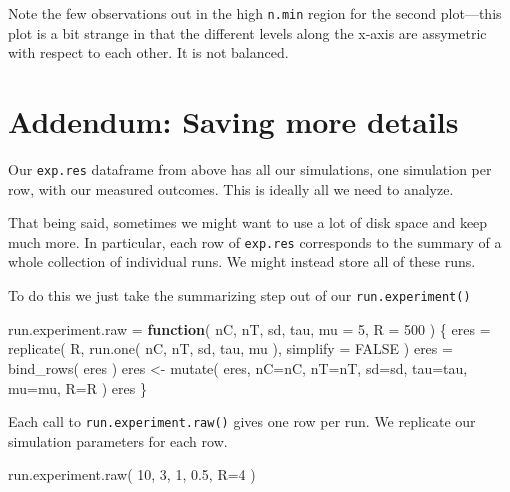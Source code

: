 \documentclass[
]{book}
\newenvironment{Shaded}{\begin{snugshade}}{\end{snugshade}}
\newcommand{\AttributeTok}[1]{\textcolor[rgb]{0.77,0.63,0.00}{#1}}
\newcommand{\ConstantTok}[1]{\textcolor[rgb]{0.00,0.00,0.00}{#1}}
\newcommand{\ControlFlowTok}[1]{\textcolor[rgb]{0.13,0.29,0.53}{\textbf{#1}}}
\newcommand{\DecValTok}[1]{\textcolor[rgb]{0.00,0.00,0.81}{#1}}
\newcommand{\FloatTok}[1]{\textcolor[rgb]{0.00,0.00,0.81}{#1}}
\newcommand{\FunctionTok}[1]{\textcolor[rgb]{0.00,0.00,0.00}{#1}}
\newcommand{\NormalTok}[1]{#1}
\newcommand{\OtherTok}[1]{\textcolor[rgb]{0.56,0.35,0.01}{#1}}
\begin{document}
Note the few observations out in the high \texttt{n.min} region for the second
plot---this plot is a bit strange in that the different levels along the
x-axis are assymetric with respect to each other. It is not balanced.

\hypertarget{addendum-saving-more-details}{%
\section{Addendum: Saving more details}\label{addendum-saving-more-details}}

Our \texttt{exp.res} dataframe from above has all our simulations, one simulation per row, with
our measured outcomes. This is ideally all we need to analyze.

That being said, sometimes we might want to use a lot of disk space and keep
much more. In particular, each row of \texttt{exp.res} corresponds to the summary
of a whole collection of individual runs. We might instead store all of
these runs.

To do this we just take the summarizing step out of our \texttt{run.experiment()}

\begin{Shaded}
\begin{Highlighting}[]
\NormalTok{run.experiment.raw }\OtherTok{=} \ControlFlowTok{function}\NormalTok{( nC, nT, sd, tau, }\AttributeTok{mu =} \DecValTok{5}\NormalTok{, }\AttributeTok{R =} \DecValTok{500}\NormalTok{ ) \{}
\NormalTok{  eres }\OtherTok{=} \FunctionTok{replicate}\NormalTok{( R, }\FunctionTok{run.one}\NormalTok{( nC, nT, sd, tau, mu ), }\AttributeTok{simplify =} \ConstantTok{FALSE}\NormalTok{ )}
\NormalTok{  eres }\OtherTok{=} \FunctionTok{bind\_rows}\NormalTok{( eres )}
\NormalTok{  eres }\OtherTok{\textless{}{-}} \FunctionTok{mutate}\NormalTok{( eres, }\AttributeTok{nC=}\NormalTok{nC, }\AttributeTok{nT=}\NormalTok{nT, }\AttributeTok{sd=}\NormalTok{sd, }\AttributeTok{tau=}\NormalTok{tau, }\AttributeTok{mu=}\NormalTok{mu, }\AttributeTok{R=}\NormalTok{R )}
\NormalTok{  eres}
\NormalTok{\}}
\end{Highlighting}
\end{Shaded}

Each call to \texttt{run.experiment.raw()} gives one row per run. We replicate our
simulation parameters for each row.

\begin{Shaded}
\begin{Highlighting}[]
\FunctionTok{run.experiment.raw}\NormalTok{( }\DecValTok{10}\NormalTok{, }\DecValTok{3}\NormalTok{, }\DecValTok{1}\NormalTok{, }\FloatTok{0.5}\NormalTok{, }\AttributeTok{R=}\DecValTok{4}\NormalTok{ )}
\end{Highlighting}
\end{Shaded}
\end{document}
